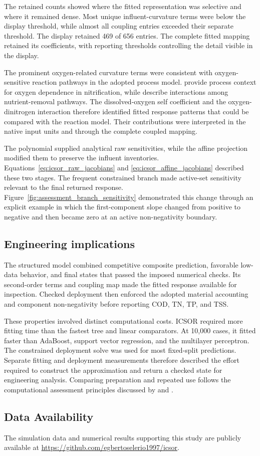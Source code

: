 The retained counts showed where the fitted representation was selective and where it remained dense. Most unique influent-curvature terms were below the display threshold, while almost all coupling entries exceeded their separate threshold. The display retained 469 of 656 entries. The complete fitted mapping retained its coefficients, with reporting thresholds controlling the detail visible in the display.

The prominent oxygen-related curvature terms were consistent with oxygen-sensitive reaction pathways in the adopted process model. \citet{StenstromSong1991} provide process context for oxygen dependence in nitrification, while \citet{Wentzel1992} describe interactions among nutrient-removal pathways. The dissolved-oxygen self coefficient and the oxygen-dinitrogen interaction therefore identified fitted response patterns that could be compared with the reaction model. Their contributions were interpreted in the native input units and through the complete coupled mapping.

The polynomial supplied analytical raw sensitivities, while the affine projection modified them to preserve the influent inventories. Equations~\eqref{eq:icsor_raw_jacobians} and \eqref{eq:icsor_affine_jacobians} described these two stages. The frequent constrained branch made active-set sensitivity relevant to the final returned response. Figure~\ref{fig:assessment_branch_sensitivity} demonstrated this change through an explicit example in which the first-component slope changed from positive to negative and then became zero at an active non-negativity boundary.

\subsection{Engineering implications}

The structured model combined competitive composite prediction, favorable low-data behavior, and final states that passed the imposed numerical checks. Its second-order terms and coupling map made the fitted response available for inspection. Checked deployment then enforced the adopted material accounting and component non-negativity before reporting COD, TN, TP, and TSS.

These properties involved distinct computational costs. ICSOR required more fitting time than the fastest tree and linear comparators. At 10,000 cases, it fitted faster than AdaBoost, support vector regression, and the multilayer perceptron. The constrained deployment solve was used for most fixed-split predictions. Separate fitting and deployment measurements therefore described the effort required to construct the approximation and return a checked state for engineering analysis. Comparing preparation and repeated use follows the computational assessment principles discussed by \citet{BhosekarIerapetritou2018} and \citet{Bliek2023}.

\subsection{Data Availability}
\label{sec:icsor_data_availability}

The simulation data and numerical results supporting this study are publicly available at \url{https://github.com/egbertoselerio1997/icsor}.
